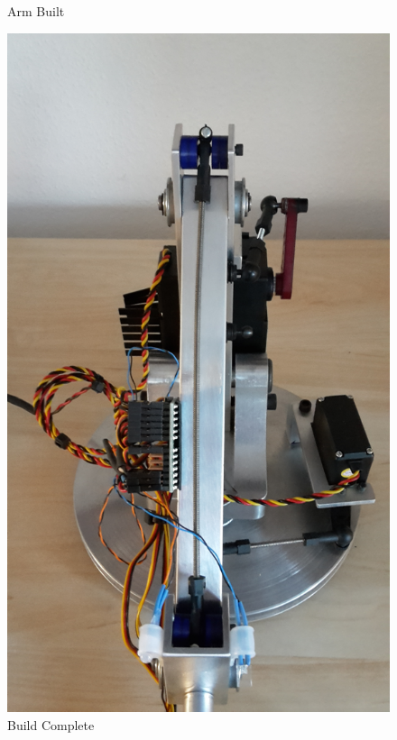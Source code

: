\documentclass[progress]{cmpreport}
\begin{document}
{{{{{{\begin{figure}[H]
	\centering
	\begin{minipage}{0.455\textwidth}
		\caption{Arm Built}
		\includegraphics[width=1.1\textwidth, angle=-90]{photos/Day36-pt1.jpg}
	\end{minipage}
	\hfill
	\begin{minipage}{0.455\textwidth}
		\caption{Build Complete}  

\end{minipage}
\end{figure}}}}}}}
\end{document}
